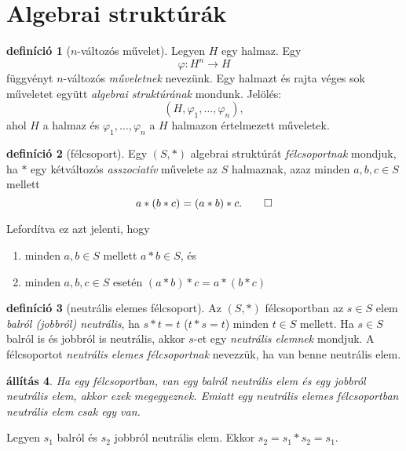 \documentclass[a4paper, showtrims]{memoir}
\makeatletter
\renewenvironment{proof}[1][\proofname]
    {\par\pushQED{\qed}%
    \normalfont \topsep6\p@\@plus6\p@\relax
    \trivlist
    \item[\hskip\labelsep
        \itshape
    #1\@addpunct{:}]\ignorespaces}
    {\popQED\endtrivlist\@endpefalse}
\theoremstyle{plain}
\newtheorem{proposition}{állítás}[chapter]
\theoremstyle{remark}
\theoremstyle{definition}
\newtheorem{definition}[proposition]{definíció}
\makeatother
\begin{document}
\section{Algebrai struktúrák}
\begin{definition}[$n$-változós művelet]
	Legyen $H$ egy halmaz. Egy
	\[
		\varphi\colon H^n\to H
	\]
	függvényt $n$-változós \emph{műveletnek} nevezünk.
	Egy halmazt és rajta véges sok műveletet együtt \emph{algebrai struktúrának} mondunk.
	Jelölés:
	$$\left(H,\varphi_1,\ldots,\varphi_n  \right),$$
	ahol $H$ a halmaz és
	$\varphi_1,\ldots,\varphi_n$ a $H$ halmazon értelmezett műveletek.
\end{definition}
\begin{definition}[félcsoport]
	Egy $\left( S,\ast \right)$ algebrai struktúrát \emph{félcsoportnak} mondjuk,
	ha $\ast$ egy kétváltozós \emph{asszociatív}
	művelete az $S$ halmaznak,
	azaz minden $a,b,c\in S$ mellett
	\[
		a\ast\left( b\ast c \right)=\left( a\ast b\right)\ast c.\qedhere
	\]
\end{definition}
Lefordítva ez azt jelenti, hogy
\begin{enumerate}
	\item minden $a,b\in S$ mellett $a\ast b\in S$, és
	\item minden $a,b,c\in S$ esetén $\left( a\ast b \right)\ast c=a\ast\left( b\ast c \right)$
\end{enumerate}
\begin{definition}[neutrális elemes félcsoport]
	Az $\left( S,\ast \right)$ félcsoportban az $s\in S$ elem \emph{balról (jobbról) neutrális},
	ha $s\ast t=t$ ($t\ast s=t$) minden $t\in S$ mellett.
	Ha $s\in S$ balról is és jobbról is neutrális, akkor $s$-et egy \emph{neutrális elemnek}
	mondjuk.
	A félcsoportot \emph{neutrális elemes félcsoportnak} nevezzük, ha van benne neutrális elem.
\end{definition}
\begin{proposition}
	Ha egy félcsoportban, van egy balról neutrális elem és egy jobbról neutrális elem,
	akkor ezek megegyeznek.
	Emiatt egy neutrális elemes félcsoportban neutrális elem csak egy van.
\end{proposition}
\begin{proof}
	Legyen $s_1$ balról és $s_2$ jobbról neutrális elem.
	Ekkor
	\(
	s_2=s_1\ast s_2=s_1.
	\)
\end{proof}
\end{document}
